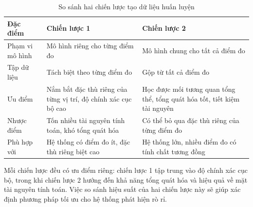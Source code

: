 \begin{table}[h]
    \centering
    \begin{tabular}{|p{4cm}|p{5cm}|p{5cm}|}
        \hline
        \textbf{Đặc điểm} & \textbf{Chiến lược 1} & \textbf{Chiến lược 2} \\
        \hline
        Phạm vi mô hình & Mô hình riêng cho từng điểm đo & Mô hình chung cho tất cả điểm đo \\
        \hline
        Tập dữ liệu & Tách biệt theo từng điểm đo & Gộp từ tất cả điểm đo \\
        \hline
        Ưu điểm & Nắm bắt đặc thù riêng của từng vị trí, độ chính xác cục bộ cao & Học được mối tương quan tổng thể, tổng quát hóa tốt, tiết kiệm tài nguyên \\
        \hline
        Nhược điểm & Tốn nhiều tài nguyên tính toán, khó tổng quát hóa & Có thể bỏ qua đặc thù riêng của từng điểm đo \\
        \hline
        Phù hợp với & Hệ thống có điểm đo ít, đặc thù riêng biệt cao & Hệ thống lớn, nhiều điểm đo có tính chất tương đồng \\
        \hline
    \end{tabular}
    \caption{So sánh hai chiến lược tạo dữ liệu huấn luyện}
    \label{tab:training_strategy_comparison}
\end{table}

Mỗi chiến lược đều có ưu điểm riêng: chiến lược 1 tập trung vào độ chính xác cục bộ, trong khi chiến lược 2 hướng đến khả năng tổng quát hóa và hiệu quả về mặt tài nguyên tính toán. Việc so sánh hiệu suất của hai chiến lược này sẽ giúp xác định phương pháp tối ưu cho hệ thống phát hiện rò rỉ.
